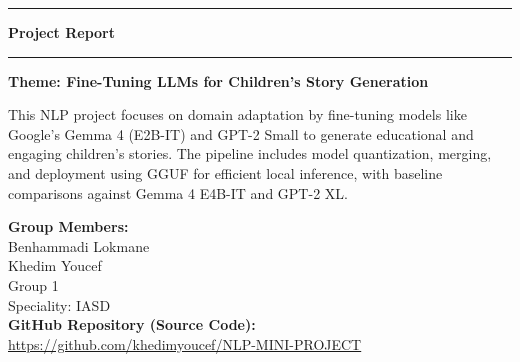\documentclass{article}
\newcommand{\makeHeaderFooter}{
\thispagestyle{fancy}
\fancyhead{}
\rhead{} 
\lhead{} 
\renewcommand{\headrulewidth}{0pt}
\fancyfoot{}
\cfoot{\fontsize{12pt}{1.2em}{\textbf{\today}}}
}
\begin{document}
\begin{titlepage}
\vspace*{\fill}

{\color{dominantColor}\hrule}
\vspace{0.6cm}

\begin{center}
\fontsize{40pt}{1.2em}\selectfont\textbf{Project Report}
\end{center}

\vspace{0.6cm}
{\color{dominantColor}\hrule}
\vspace{0.8cm}

\begin{center}
\fontsize{21pt}{1.4em}\selectfont
\textbf{Theme: Fine-Tuning LLMs for Children's Story Generation}
\end{center}

\vspace{0.6in}

\begin{center}
\fontsize{19pt}{1.4em}\selectfont
This NLP project focuses on domain adaptation by fine-tuning models like Google's Gemma 4 (E2B-IT) and GPT-2 Small to generate educational and engaging children's stories. The pipeline includes model quantization, merging, and deployment using GGUF for efficient local inference, with baseline comparisons against Gemma 4 E4B-IT and GPT-2 XL.
\end{center}

\vspace{0.6in}

\begin{center}
\fontsize{17pt}{1.35em}\selectfont
\textbf{Group Members:} \\[0.3cm]
Benhammadi Lokmane \\[0.3cm]
Khedim Youcef \\[0.3cm]

Group 1 \\
Speciality: IASD \\[0.5cm]

\textbf{GitHub Repository (Source Code):} \\
\url{https://github.com/khedimyoucef/NLP-MINI-PROJECT}
\end{center}

\vspace*{\fill}
\makeHeaderFooter
\end{titlepage}
\end{document}
